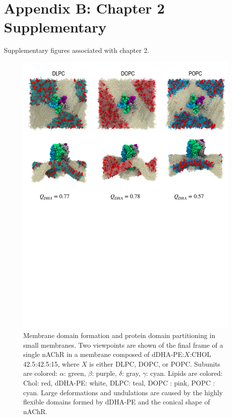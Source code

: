 \documentclass[12pt]{ruthesis_nofloat}
\begin{document}
\section*{Appendix B: Chapter 2 Supplementary}
Supplementary figures associated with chapter 2.
\renewcommand{\thefigure}{B1}
\begin{figure}

		\includegraphics[width=1\linewidth]{ModelMemb_Images/SI_Chains.pdf}
	
		\caption[Membrane domain formation and protein domain partitioning in small membranes.] {Membrane domain formation and protein domain partitioning in small membranes. Two viewpoints are shown of the final frame of a single nAChR in a membrane composed of dDHA-PE:$X$:CHOL 42.5:42.5:15, where $X$ is either DLPC, DOPC, or POPC. Subunits are colored: $\alpha$: green, $\beta$: purple, $\delta$: gray, $\gamma$: cyan. Lipids are colored: Chol: red, dDHA-PE: white, DLPC: teal, DOPC : pink, POPC : cyan. Large deformations and undulations are caused by the highly flexible domains formed by dDHA-PE and the conical shape of nAChR.}  %
	\label{fig:sat_chains}
\end{figure}
\end{document}
